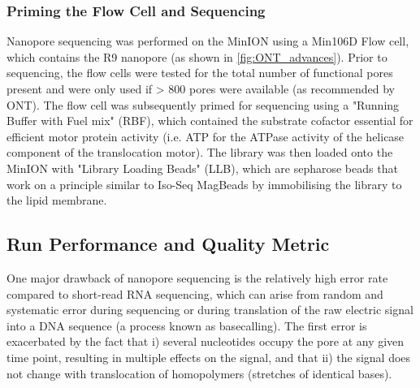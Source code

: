\subsubsection{Priming the Flow Cell and Sequencing}
\label{sec: ONTlib_sequencing}
Nanopore sequencing was performed on the MinION using a Min106D Flow cell, which contains the R9 nanopore (as shown in \cref{fig:ONT_advances}). Prior to sequencing, the flow cells were tested for the total number of functional pores present and were only used if > 800 pores were available (as recommended by ONT). The flow cell was subsequently primed for sequencing using a "Running Buffer with Fuel mix" (RBF), which contained the substrate cofactor essential for efficient motor protein activity (i.e. ATP for the ATPase activity of the helicase component of the translocation motor). The library was then loaded onto the MinION with "Library Loading Beads" (LLB), which are sepharose beads that work on a principle similar to Iso-Seq MagBeads by immobilising the library to the lipid membrane.

\subsection{Run Performance and Quality Metric}
\label{ONT_performance}
One major drawback of nanopore sequencing is the relatively high error rate compared to short-read RNA sequencing, which can arise from random and systematic error during sequencing or during translation of the raw electric signal into a DNA sequence (a process known as basecalling)\cite{Rang2018}. The first error is exacerbated by the fact that i) several nucleotides occupy the pore at any given time point, resulting in multiple effects on the signal, and that ii) the signal does not change with translocation of homopolymers (stretches of identical bases).

